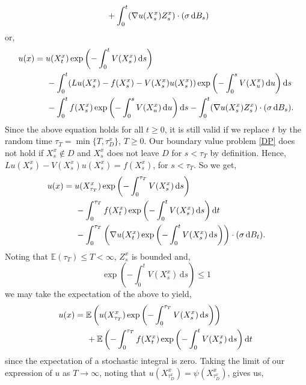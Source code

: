 \documentclass[a4paper,12pt,draft]{report}
\theoremstyle{remark}
\theoremstyle{definition}
\begin{document}
{\begin{align}
& \hspace{0.5cm} + \int_0^t(\nabla u(X_s^x)Z_s^x)\cdot(\sigma\,\mathrm{d}B_s)\nonumber
\end{align}
or,
\begin{align}
u(x) & = u(X_t^x)\exp\left(-\int_0^tV(X_s^x)\,\mathrm{d}s\right)\nonumber\\
& \hspace{0.5cm} - \int_0^t(Lu(X_s^x) - f(X_s^x) - V(X_s^x)u(X_s^x))\exp\left(-\int_0^sV(X_u^x)\,\mathrm{d}u\right)\mathrm{d}s\nonumber\\
& \hspace{0.5cm} - \int_0^tf(X_s^x)\exp\left(-\int_0^sV(X_u^x)\,\mathrm{d}u\right)\mathrm{d}s - \int_0^t(\nabla u(X_s^x)Z_s^x)\cdot(\sigma\,\mathrm{d}B_s).\nonumber
\end{align}
Since the above equation holds for all $t \ge 0$, it is still valid if we replace $t$ by the random time $\tau_T = \min\{T, \tau_D^x\}$, $T \ge 0$.  Our boundary value problem \eqref{DP} does not hold if $X_s^x \notin D$ and  $X_s^x$ does not leave $D$ for $s < \tau_T$ by definition.  Hence, $Lu(X_s^x) - V(X_s^x)u(X_s^x) = f(X_s^x)$,  for $s < \tau_T$.  So we get,
\begin{align}
u(x) & = u(X_{\tau_T}^x)\exp\left(-\int_0^{\tau_T}V(X_s^x)\,\mathrm{d}s\right)\nonumber\\
& \hspace{0.5cm} - \int_0^{\tau_T}f(X_t^x)\exp\left(-\int_0^tV(X_s^x)\,\mathrm{d}s\right)\mathrm{d}t\nonumber\\
& \hspace{0.5cm} - \int_0^{\tau_T}\left(\nabla u(X_t^x)\exp\left(-\int_0^tV(X_s^x)\,\mathrm{d}s\right)\right)\cdot(\sigma\,\mathrm{d}B_t).\nonumber
\end{align}
Noting that $\mathbb{E}(\tau_T) \le T < \infty$, $Z_s^x$ is bounded and,
$$
\exp\left(-\int_0^tV(X_s^x)\,\mathrm{d}s\right) \le 1
$$
we may take the expectation of the above to yield,
\begin{align}
u(x) & = \mathbb{E}\left(u(X_{\tau_T}^x)\exp\left(-\int_0^{\tau_T}V(X_s^x)\,\mathrm{d}s\right)\right)\nonumber\\
& \hspace{0.5cm} + \mathbb{E}\left(-\int_0^{\tau_T}f(X_t^x)\exp\left(-\int_0^tV(X_s^x)\,\mathrm{d}s\right)\mathrm{d}t\right.\nonumber
\end{align}
since the expectation of a stochastic integral is zero.  Taking the limit of our expression of $u$ as $T \to \infty$, noting that $u(X_{\tau_D^x}^x) = \psi(X_{\tau_D^x}^x)$, gives us,
}
\end{document}

